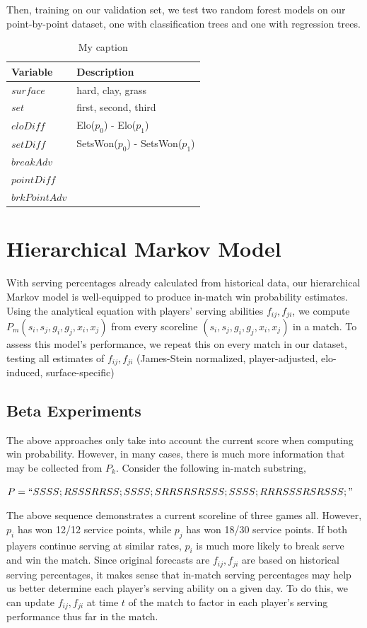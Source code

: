\documentclass[chapterprefix=false]{report}
\begin{document}
Then, training on our validation set, we test two random forest models on our point-by-point dataset, one with classification trees and one with regression trees.

\begin{table}[]
\centering
\caption{My caption}
\label{my-label}
\begin{tabular}{ll}
 \hline
 Variable & Description \\
 \hline
 $surface$ & hard, clay, grass \\
 \hline
 $set$ &  first, second, third \\
 \hline
 $eloDiff$ &  Elo($p_0$) - Elo($p_1$) \\
 \hline
 $setDiff$ &  SetsWon($p_0$) - SetsWon($p_1$)\\
 \hline
 $breakAdv$ &  \\
 \hline
 $pointDiff$ &  \\
 \hline
 $brkPointAdv$ & \\
 \hline
\end{tabular}
\end{table}

\section{Hierarchical Markov Model}
With serving percentages already calculated from historical data, our hierarchical Markov model is well-equipped to produce in-match win probability estimates. Using the analytical equation with players' serving abilities $f_{ij},f_{ji}$, we compute $P_m(s_i,s_j,g_i,g_j,x_i,x_j)$ from every scoreline $(s_i,s_j,g_i,g_j,x_i,x_j)$ in a match. To assess this model's performance, we repeat this on every match in our dataset, testing all estimates of $f_{ij},f_{ji}$ (James-Stein normalized, player-adjusted, elo-induced, surface-specific)

\subsection{Beta Experiments}
The above approaches only take into account the current score when computing win probability. However, in many cases, there is much more information that may be collected from $P_k$. Consider the following in-match substring, 

$P=``SSSS;RSSSRRSS;SSSS;SRRSRSRSSS;SSSS;RRRSSSRSRSSS;"$

The above sequence demonstrates a current scoreline of three games all. However, $p_i$ has won 12/12 service points, while $p_j$ has won 18/30 service points. If both players continue serving at similar rates, $p_i$ is much more likely to break serve and win the match. Since original forecasts are $f_{ij},f_{ji}$ are based on historical serving percentages, it makes sense that in-match serving percentages may help us better determine each player's serving ability on a given day. To do this, we can update $f_{ij},f_{ji}$ at time $t$ of the match to factor in each player's serving performance thus far in the match.
\end{document}
